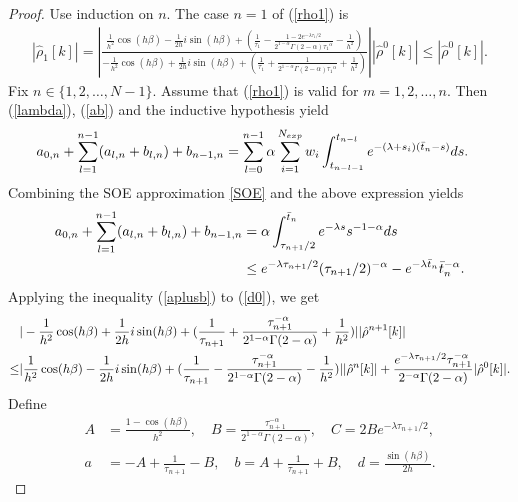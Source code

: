 \documentclass[10pt,a4paper]{amsart}
\begin{document}
\begin{proof}
Use induction on $n$. The case $n=1$ of (\ref{rho1}) is
\begin{align}
    |\hat{\rho}_{1}[k]|=\left|\frac{\frac{1}{h^2}\cos(h\beta)-\frac{1}{2h}i\sin(h\beta)+(\frac{1}{\tau_{1}}-\frac{1-2e^{-\lambda {\tau_{1}}/{2}}}{2^{1-\alpha}\Gamma(2-\alpha){\tau_{1}}^\alpha}-\frac{1}{h^2}) }{-\frac{1}{h^2}\cos(h\beta)+\frac{1}{2h}i\sin(h\beta)+(\frac{1}{\tau_{1}}+\frac{1}{2^{1-\alpha}\Gamma(2-\alpha){\tau_{1}}^\alpha}+\frac{1}{h^2}) }\right||\hat{\rho}^{0}[k]| \leq |\hat{\rho}^{0}[k]|.
\end{align}
Fix $n\in \{1,2,\dots,N-1\}$. Assume that (\ref{rho1}) is valid for \(m=1,2,\dots,n\). Then (\ref{lambda}), (\ref{ab})
and the inductive hypothesis yield
\begin{align}
  a_{0,n}+\sum_{l=1}^{n-1}(a_{l, n}+b_{l, n})+b_{n-1,n}  
  &=\sum_{l=0}^{n-1}\alpha \sum_{i=1}^{N_{exp}}w_i\int_{t_{n-l-1}}^{t_{n-l}}e^{-(\lambda+s_i)(\bar{t}_n-s)}ds.\notag
\end{align}
Combining the SOE approximation \eqref{SOE} and the above expression yields
\begin{align}
  a_{0,n}+\sum_{l=1}^{n-1}(a_{l, n}+b_{l, n})+b_{n-1,n}  
&=\alpha\int_{{\tau_{n+1}}/{2}}^{\bar{t}_n}{e^{-\lambda s}}{s^{-1-\alpha}}ds\notag\\
  &\leq {e^{-\lambda {\tau_{n+1}}/{2}}}{({\tau_{n+1}}/{2})^{-\alpha}}-{e^{-\lambda \bar{t}_n}}{\bar{t}_n^{-\alpha}}.\label{aplusb}
\end{align}
Applying the inequality (\ref{aplusb}) to (\ref{d0}), we get
\begin{align}
    &|-\frac{1}{h^2}\cos(h\beta)+\frac{1}{2h}i\sin(h\beta)+(\frac{1}{\tau_{n+1}}+\frac{\tau_{n+1}^{-\alpha}}{2^{1-\alpha}\Gamma(2-\alpha)}+\frac{1}{h^2}) ||\hat{\rho}^{n+1}[k]|\notag \\
    \leq&|\frac{1}{h^2}\cos(h\beta)-\frac{1}{2h}i\sin(h\beta)+(\frac{1}{\tau_{n+1}}-\frac{\tau_{n+1}^{-\alpha}}{2^{1-\alpha}\Gamma(2-\alpha)}-\frac{1}{h^2}) ||\hat{\rho}^{n}[k]| +\frac{e^{-\lambda {\tau_{n+1}}/{2}}\tau_{n+1}^{-\alpha}}{2^{-\alpha}\Gamma(2-\alpha)}|\hat{\rho}^{0}[k]|.\label{need1}
\end{align}
Define
\begin{align*}
A &= \frac{1-\cos(h\beta)}{h^2},\quad B=\frac{\tau_{n+1}^{-\alpha}}{2^{1-\alpha}\Gamma(2-\alpha)},\quad C=2Be^{-\lambda{\tau_{n+1}}/{2}},\\
a&=-A+\frac{1}{\tau_{n+1}}-B,\quad b=A+\frac{1}{\tau_{n+1}}+B,\quad d=\frac{\sin(h\beta)}{2h}.
\end{align*}

\end{proof}
\end{document}
